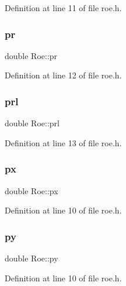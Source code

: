 Definition at line 11 of file roe.\+h.

\mbox{\label{classRoe_a192ea3de117ed94fe04d244cb2174785}} 
\subsubsection{\texorpdfstring{pr}{pr}}
{\footnotesize\ttfamily double Roe\+::pr\hspace{0.3cm}{\ttfamily [private]}}



Definition at line 12 of file roe.\+h.

\mbox{\label{classRoe_a45fef8454e2149fda58bcd64ae4a9f58}} 
\subsubsection{\texorpdfstring{prl}{prl}}
{\footnotesize\ttfamily double Roe\+::prl\hspace{0.3cm}{\ttfamily [private]}}



Definition at line 13 of file roe.\+h.

\mbox{\label{classRoe_a02cb59599c38a21472777e9de7f6f1ed}} 
\subsubsection{\texorpdfstring{px}{px}}
{\footnotesize\ttfamily double Roe\+::px\hspace{0.3cm}{\ttfamily [private]}}



Definition at line 10 of file roe.\+h.

\mbox{\label{classRoe_a4d74b032fc909bf6b50989bacd908e03}} 
\subsubsection{\texorpdfstring{py}{py}}
{\footnotesize\ttfamily double Roe\+::py\hspace{0.3cm}{\ttfamily [private]}}



Definition at line 10 of file roe.\+h.

